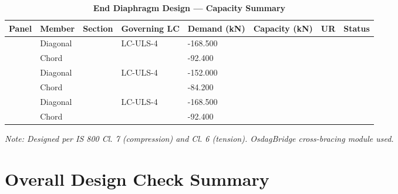 \documentclass[12pt,a4paper]{report}
\numberwithin{table}{chapter}
\numberwithin{figure}{chapter}
\begin{document}
\vspace{1em}

\begin{longtable}{|C{2.0cm}|L{1.8cm}|C{2.2cm}|C{3.0cm}|C{1.8cm}|C{1.8cm}|C{1.2cm}|C{1.8cm}|}
\caption{\textbf{End Diaphragm Design --- Capacity Summary}}
\hline
\textbf{Panel} & \textbf{Member} & \textbf{Section} & \textbf{Governing LC} & \textbf{Demand (kN)} & \textbf{Capacity (kN)} & \textbf{UR} & \textbf{Status} \\[6pt]
\hline
{} & Diagonal &  & LC-ULS-4 & -168.500 &  &  &  \\[6pt]
 & Chord &  &  & -92.400 &  &  &  \\[6pt]
\hline
{} & Diagonal &  & LC-ULS-4 & -152.000 &  &  &  \\[6pt]
 & Chord &  &  & -84.200 &  &  &  \\[6pt]
\hline
{} & Diagonal &  & LC-ULS-4 & -168.500 &  &  &  \\[6pt]
 & Chord &  &  & -92.400 &  &  &  \\[6pt]
\hline
\end{longtable}
\noindent\textit{Note: Designed per IS 800 Cl. 7 (compression) and Cl. 6 (tension). OsdagBridge cross-bracing module used.}

\section{Overall Design Check Summary}
\label{sec:overall-summary}
\end{document}
